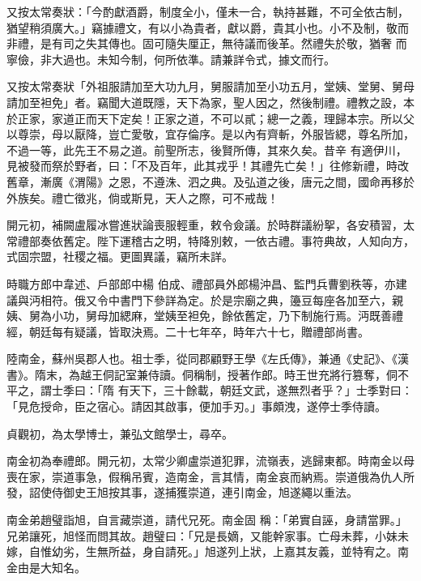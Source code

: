 \begin{pinyinscope}
 又按太常奏狀：「今酌獻酒爵，制度全小，僅未一合，執持甚難，不可全依古制，猶望稍須廣大。」竊據禮文，有以小為貴者，獻以爵，貴其小也。小不及制，敬而非禮，是有司之失其傳也。固可隨失厘正，無待議而後革。然禮失於敬，猶奢
 而寧儉，非大過也。未知今制，何所依準。請兼詳令式，據文而行。



 又按太常奏狀「外祖服請加至大功九月，舅服請加至小功五月，堂姨、堂舅、舅母請加至袒免」者。竊聞大道既隱，天下為家，聖人因之，然後制禮。禮教之設，本於正家，家道正而天下定矣！正家之道，不可以貳；總一之義，理歸本宗。所以父以尊崇，母以厭降，豈亡愛敬，宜存倫序。是以內有齊斬，外服皆緦，尊名所加，不過一等，此先王不易之道。前聖所志，後賢所傳，其來久矣。昔辛
 有適伊川，見被發而祭於野者，曰：「不及百年，此其戎乎！其禮先亡矣！」往修新禮，時改舊章，漸廣《渭陽》之恩，不遵洙、泗之典。及弘道之後，唐元之間，國命再移於外族矣。禮亡徵兆，倘或斯見，天人之際，可不戒哉！



 開元初，補闕盧履冰嘗進狀論喪服輕重，敕令僉議。於時群議紛挐，各安積習，太常禮部奏依舊定。陛下運稽古之明，特降別敕，一依古禮。事符典故，人知向方，式固宗盟，社稷之福。更圖異議，竊所未詳。



 時職方郎中韋述、戶部郎中楊
 伯成、禮部員外郎楊沖昌、監門兵曹劉秩等，亦建議與沔相符。俄又令中書門下參詳為定。於是宗廟之典，籩豆每座各加至六，親姨、舅為小功，舅母加緦麻，堂姨至袒免，餘依舊定，乃下制施行焉。沔既善禮經，朝廷每有疑議，皆取決焉。二十七年卒，時年六十七，贈禮部尚書。



 陸南金，蘇州吳郡人也。祖士季，從同郡顧野王學《左氏傳》，兼通《史記》、《漢書》。隋末，為越王侗記室兼侍讀。侗稱制，授著作郎。時王世充將行篡奪，侗不平之，謂士季曰：「隋
 有天下，三十餘載，朝廷文武，遂無烈者乎？」士季對曰：「見危授命，臣之宿心。請因其啟事，便加手刃。」事頗洩，遂停士季侍讀。



 貞觀初，為太學博士，兼弘文館學士，尋卒。



 南金初為奉禮郎。開元初，太常少卿盧崇道犯罪，流嶺表，逃歸東都。時南金以母喪在家，崇道事急，假稱吊賓，造南金，言其情，南金哀而納焉。崇道俄為仇人所發，詔使侍御史王旭按其事，遂捕獲崇道，連引南金，旭遂繩以重法。



 南金弟趙璧詣旭，自言藏崇道，請代兄死。南金固
 稱：「弟實自誣，身請當罪。」兄弟讓死，旭怪而問其故。趙璧曰：「兄是長嫡，又能幹家事。亡母未葬，小妹未嫁，自惟幼劣，生無所益，身自請死。」旭遂列上狀，上嘉其友義，並特宥之。南金由是大知名。




\end{pinyinscope}
